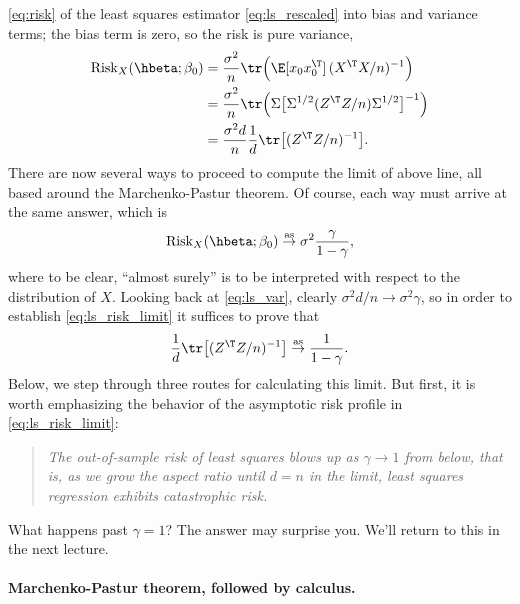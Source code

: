 \documentclass{article}
\begin{document}
\eqref{eq:risk} of the least squares estimator \eqref{eq:ls_rescaled} into bias
and variance terms; the bias term is zero, so the risk is pure variance,      
\begin{align}
\nonumber
\Risk_X(\hbeta; \beta_0) 
&= \frac{\sigma^2}{n} \tr\Big(\E [x_0 x_0^\T] \, (X^\T X/n)^{-1} \Big) \\
\nonumber
&= \frac{\sigma^2}{n}\tr\Big(\Sigma \big[ \Sigma^{1/2} (Z^\T Z/n) \Sigma^{1/2} 
  \big]^{-1} \Big) \\ 
\label{eq:ls_var}
&= \frac{\sigma^2 d}{n} \frac{1}{d} \tr \big[ (Z^\T Z/n)^{-1} \big].
\end{align}
There are now several ways to proceed to compute the limit of above line, all
based around the Marchenko-Pastur theorem. Of course, each way must arrive at
the same answer, which is
\begin{equation}
\label{eq:ls_risk_limit}
\Risk_X(\hbeta; \beta_0) \asto \sigma^2 \frac{\gamma}{1-\gamma},
\end{equation}
where to be clear, ``almost surely'' is to be interpreted with respect to the
distribution of $X$. Looking back at \eqref{eq:ls_var}, clearly $\sigma^2 d/n
\to \sigma^2 \gamma$, so in order to establish \eqref{eq:ls_risk_limit} it
suffices to prove that   
\begin{equation}
\label{eq:ls_var_limit}
\frac{1}{d} \tr \big[ (Z^\T Z/n)^{-1} \big] \asto \frac{1}{1-\gamma}.
\end{equation}
Below, we step through three routes for calculating this limit. But first, it is
worth emphasizing the behavior of the asymptotic risk profile in
\eqref{eq:ls_risk_limit}:  
\begin{quote}
\centering\it
The out-of-sample risk of least squares blows up as $\gamma \to 1$ from below,
that is, as we grow the aspect ratio until $d = n$ in the limit, least squares
regression exhibits catastrophic risk.  
\end{quote}
What happens past $\gamma = 1$? The answer may surprise you. We'll return to
this in the next lecture.  

\paragraph{Marchenko-Pastur theorem, followed by calculus.}  
\end{document}
